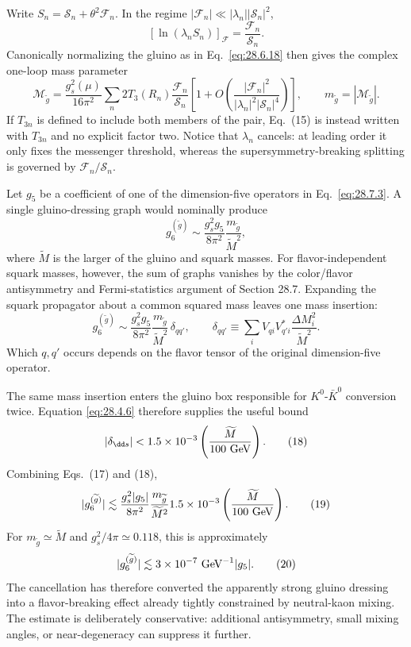 \begin{enumerate}
  Write
  \(S_n=\mathcal S_n+\theta^2\mathcal F_n\).  In the regime
  \(|\mathcal F_n|\ll|\lambda_n||\mathcal S_n|^2\),
  \[
    [\ln(\lambda_nS_n)]_{\mathcal F}
      =\frac{\mathcal F_n}{\mathcal S_n}.
    \tag{14}
  \]
  Canonically normalizing the gluino as in
  Eq.~\eqref{eq:28.6.18} then gives the complex one-loop mass parameter
  \[
    \mathcal M_{\widetilde g}
      =\frac{g_s^2(\mu)}{16\pi^2}
        \sum_n2T_3(R_n)\frac{\mathcal F_n}{\mathcal S_n}
        \left[
          1+O\!\left(
            \frac{|\mathcal F_n|^2}
                 {|\lambda_n|^2|\mathcal S_n|^4}
          \right)
        \right],
    \qquad
    m_{\widetilde g}=|\mathcal M_{\widetilde g}|.
    \tag{15}
  \]
  If \(T_{3n}\) is defined to include both members of the pair, Eq.~(15)
  is instead written with \(T_{3n}\) and no explicit factor two.
  Notice that \(\lambda_n\) cancels: at leading order it only fixes the
  messenger threshold, whereas the supersymmetry-breaking splitting is
  governed by \(\mathcal F_n/\mathcal S_n\).

  Let \(g_5\) be a coefficient of one of the dimension-five operators
  in Eq.~\eqref{eq:28.7.3}.  A single gluino-dressing graph would
  nominally produce
  \[
    g_6^{(\widetilde g)}
      \sim\frac{g_s^2g_5}{8\pi^2}
        \frac{m_{\widetilde g}}{\widetilde M^2},
    \tag{16}
  \]
  where \(\widetilde M\) is the larger of the gluino and squark masses.
  For flavor-independent squark masses, however, the sum of graphs
  vanishes by the color/flavor antisymmetry and Fermi-statistics argument
  of Section 28.7.  Expanding the squark propagator about a common squared
  mass leaves one mass insertion:
  \[
    g_6^{(\widetilde g)}
      \sim\frac{g_s^2g_5}{8\pi^2}
        \frac{m_{\widetilde g}}{\widetilde M^2}\,
        \delta_{qq'},\qquad
    \delta_{qq'}\equiv
      \sum_iV_{qi}V_{q'i}^*
      \frac{\Delta M_i^2}{\widetilde M^2}.
    \tag{17}
  \]
  Which \(q,q'\) occurs depends on the flavor tensor of the original
  dimension-five operator.

  The same mass insertion enters the gluino box responsible for
  \(K^0\)-\(\bar K^0\) conversion twice.  Equation
  \eqref{eq:28.4.6} therefore supplies the useful bound
  \[
    |\delta_{\dd s}|
      <1.5\times10^{-3}
        \left(\frac{\widetilde M}{100\ {\rm GeV}}\right).
    \tag{18}
  \]
  Combining Eqs.~(17) and (18),
  \[
    |g_6^{(\widetilde g)}|
      \lesssim
      \frac{g_s^2|g_5|}{8\pi^2}
      \frac{m_{\widetilde g}}{\widetilde M^2}
      1.5\times10^{-3}
      \left(\frac{\widetilde M}{100\ {\rm GeV}}\right).
    \tag{19}
  \]
  For \(m_{\widetilde g}\simeq\widetilde M\) and
  \(g_s^2/4\pi\simeq0.118\), this is approximately
  \[
    |g_6^{(\widetilde g)}|
      \lesssim3\times10^{-7}\ {\rm GeV}^{-1}|g_5|.
    \tag{20}
  \]
  The cancellation has therefore converted the apparently strong
  gluino dressing into a flavor-breaking effect already tightly
  constrained by neutral-kaon mixing.  The estimate is deliberately
  conservative: additional antisymmetry, small mixing angles, or
  near-degeneracy can suppress it further.
\end{enumerate}
